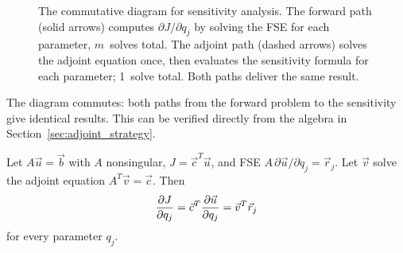 \begin{figure}[htb]
\centering
{}
\caption{The commutative diagram for sensitivity analysis.
         The forward path (solid arrows) computes $\partial J/\partial q_j$
         by solving the FSE for each parameter, $m$~solves total.
         The adjoint path (dashed arrows) solves the adjoint equation
         once, then evaluates the sensitivity formula for each parameter;
         1~solve total.
         Both paths deliver the same result.}
\label{fig:commdiag}
\end{figure}

The diagram commutes: both paths from the forward problem to the
sensitivity give identical results. This can be verified directly
from the algebra in Section~\ref{sec:adjoint_strategy}.

\begin{theorem}
\label{thm:equiv}
Let $A\vec{u} = \vec{b}$ with $A$ nonsingular, $J = \vec{c}^T\vec{u}$,
and FSE $A\,\partial\vec{u}/\partial q_j = \vec{r}_j$.
Let $\vec{v}$ solve the adjoint equation $A^T\vec{v} = \vec{c}$.
Then
\[
  \frac{\partial J}{\partial q_j} = \vec{c}^T\frac{\partial \vec{u}}{\partial q_j} = \vec{v}^T\vec{r}_j
\]
for every parameter $q_j$.
\end{theorem}

